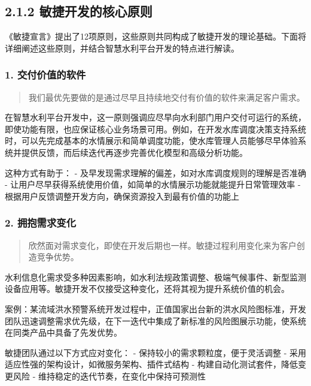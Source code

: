 \subsection{2.1.2
敏捷开发的核心原则}\label{ux654fux6377ux5f00ux53d1ux7684ux6838ux5fc3ux539fux5219}

《敏捷宣言》提出了12项原则，这些原则共同构成了敏捷开发的理论基础。下面将详细阐述这些原则，并结合智慧水利平台开发的特点进行解读。

\subsubsection{1.
交付价值的软件}\label{ux4ea4ux4ed8ux4ef7ux503cux7684ux8f6fux4ef6}

\begin{quote}
我们最优先要做的是通过尽早且持续地交付有价值的软件来满足客户需求。
\end{quote}

在智慧水利平台开发中，这一原则强调应尽早向水利部门用户交付可运行的系统，即使功能有限，也应保证核心业务场景可用。例如，在开发水库调度决策支持系统时，可以先完成基本的水情展示和简单调度功能，使水库管理人员能够尽早体验系统并提供反馈，而后续迭代再逐步完善优化模型和高级分析功能。

这种方式有助于： -
及早发现需求理解的偏差，如对水库调度规则的理解是否准确 -
让用户尽早获得系统使用价值，如简单的水情展示功能就能提升日常管理效率 -
根据用户反馈调整开发方向，确保资源投入到最有价值的功能上

\subsubsection{2.
拥抱需求变化}\label{ux62e5ux62b1ux9700ux6c42ux53d8ux5316}

\begin{quote}
欣然面对需求变化，即使在开发后期也一样。敏捷过程利用变化来为客户创造竞争优势。
\end{quote}

水利信息化需求受多种因素影响，如水利法规政策调整、极端气候事件、新型监测设备应用等。敏捷开发不仅接受这种变化，还将其视为提升系统价值的机会。

案例：某流域洪水预警系统开发过程中，正值国家出台新的洪水风险图标准，开发团队迅速调整需求优先级，在下一迭代中集成了新标准的风险图展示功能，使系统在同类产品中具备了先发优势。

敏捷团队通过以下方式应对变化： - 保持较小的需求颗粒度，便于灵活调整 -
采用适应性强的架构设计，如微服务架构、插件式结构 -
构建自动化测试套件，降低变更风险 -
维持稳定的迭代节奏，在变化中保持可预测性

